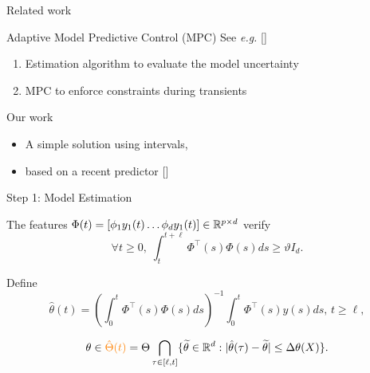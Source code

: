 \documentclass[slideopt,A4,showboxes,svgnames]{beamer}
\begin{document}
\begin{frame}{Related work}

\begin{alertblock}{Adaptive Model Predictive Control (MPC)}
	See \textit{e.g.} [\cite{Fukushima2007,Adetola2009,Adetola2011,Aswani2013,Vicente2019}]
	\pause
	\begin{enumerate}[<+->]
		\item Estimation algorithm to evaluate the model uncertainty
		\item MPC to enforce constraints during transients
	\end{enumerate}
\end{alertblock}
\pause[\thebeamerpauses]
\begin{exampleblock}{Our work}
	\begin{itemize}
		\item A simple solution using \alert{intervals},
		\item based on a \alert{recent predictor} [\cite{leurent2019interval}]
	\end{itemize}
\end{exampleblock}
\end{frame}

\begin{frame}{Step 1: Model Estimation}
\begin{assumption}
	\label{assu:PE}
	The features $\Phi(t)=[\phi_{1}y_{1}(t)\dots\phi_{d}y_{1}(t)]\in\mathbb{R}^{p\times d}$ verify
	\[\forall t\geq 0,\;
	\int_{t}^{t+\ell}\Phi^{\top}(s)\Phi(s)ds\ge\vartheta I_{d}.
	\]
\end{assumption}
\pause
Define \begin{equation*}
\hat{\theta}(t)=
\left(\int_{0}^{t}\Phi^{\top}(s)\Phi(s)ds\right)^{-1}\int_{0}^{t}\Phi^{\top}(s)y(s)ds,\, t\geq\ell,
\end{equation*}
\pause
\begin{proposition}
	\begin{equation*}
	\theta \in {\color{orange}\hat{\Theta}(t)}=\Theta\bigcap_{\tau\in[\ell,t]}\{\widetilde{\theta}\in\mathbb{R}^{d}:|\hat{\theta}(\tau)-\widetilde{\theta}|\leq\Delta\theta(X)\}.\label{eq:set_LS}
	\end{equation*}
\end{proposition}
\end{frame}
\end{document}
